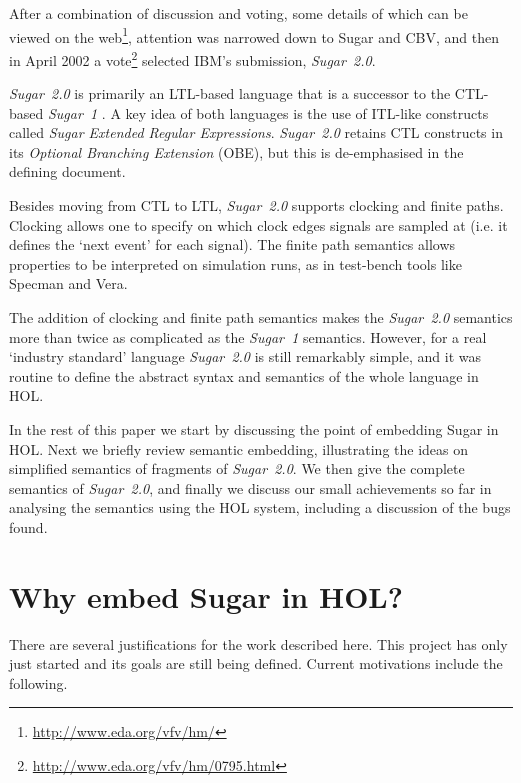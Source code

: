 \documentclass{llncs}
\newcommand\Sugar{{\it{Sugar~2.0}}\xspace}
\newcommand\Hol{HOL\xspace}
\begin{document}
\vspace*{-3mm}

After a combination of discussion and voting, some details of which
can be viewed on the web\footnote{\url{http://www.eda.org/vfv/hm/}},
attention was narrowed down to Sugar and CBV, and then in April
2002 a vote\footnote{\url{http://www.eda.org/vfv/hm/0795.html}}
selected IBM's submission, \Sugar.


\Sugar is primarily an LTL-based language that is a successor to 
the CTL-based {\it Sugar~1\/} \cite{sugar}. A key idea of both languages is the use
of ITL-like \cite{ITL} constructs called {\it Sugar Extended Regular Expressions}.
\Sugar retains CTL constructs in its {\it Optional Branching Extension} (OBE),
but this is de-emphasised in the defining document.

Besides moving from CTL to LTL, \Sugar supports clocking and finite
paths.  Clocking allows one to specify on which clock edges signals are
sampled at (i.e. it defines the `next event' for each signal). The
finite path semantics allows properties to be interpreted on
simulation runs, as in test-bench tools like Specman and Vera.

The addition of clocking and finite path semantics makes the \Sugar
semantics more than twice as complicated as the {\it Sugar~1}
semantics. However, for a real `industry standard' language \Sugar is still
remarkably simple, and it was routine to define the abstract syntax
and semantics of the whole language in \Hol \cite{GordonMelham}.

In the rest of this paper we start by discussing the point of
embedding Sugar in \Hol. Next we briefly review semantic embedding,
illustrating the
ideas on simplified semantics of fragments of \Sugar.  We then
give the complete semantics of \Sugar, and finally we discuss our
small achievements so far in analysing the semantics using the
\Hol system, including a discussion of the bugs found.

\vspace*{-3mm}

\section{Why embed Sugar in \Hol?}

\vspace*{-3mm}

There are several justifications for the work described here. This project
has only just started and its goals are still being defined. Current motivations include
the following.
\end{document}
